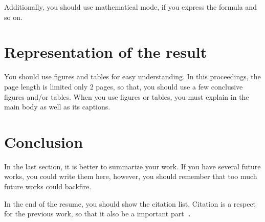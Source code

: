 \documentclass[twocolumn, a4paper]{UECIEresumeE}
\begin{document}
Additionally, you should use mathematical mode, if you express the formula and so on.

\section{Representation of the result}

You should use figures and tables for easy understanding.
In this proceedings, the page length is limited only 2 pages, so that,
you should use a few conclusive figures and/or tables.
When you use figures or tables, you must explain in the main body as well as its captions.

\section{Conclusion}

In the last section, it is better to summarize your work. If you have several future works, you could write them here, however, you should remember that too much future works could backfire.

In the end of the resume, you should show the citation list.
Citation is a respect for the previous work, so that it also be a 
important part~\cite{Kinoshita_en}．

{\small


}
\end{document}
